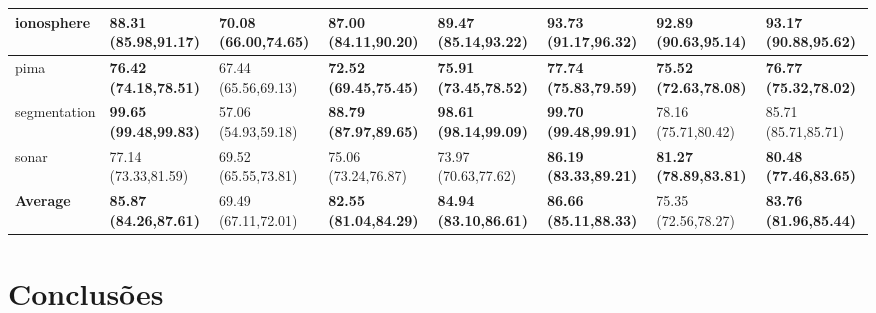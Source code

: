 \documentclass[conference]{IEEEtran}
\begin{document}
\begin{table*}[thpbh]
\begin{adjustbox}{width=1\textwidth}
\begin{tabular}{@{}cccccccc@{}}
			\multicolumn{1}{|l|}{ionosphere}   & \multicolumn{1}{l|}{\textbf{88.31 (85.98,91.17)}} & \multicolumn{1}{l|}{70.08 (66.00,74.65)} & \multicolumn{1}{l|}{\textbf{87.00 (84.11,90.20)}} & \multicolumn{1}{l|}{\textbf{89.47 (85.14,93.22)}}  & \multicolumn{1}{l|}{\textbf{93.73 (91.17,96.32)}}    & \multicolumn{1}{l|}{\textbf{92.89 (90.63,95.14)}}    & \multicolumn{1}{l|}{93.17 (90.88,95.62)}    \\ \midrule
			\multicolumn{1}{|l|}{pima}         & \multicolumn{1}{l|}{\textbf{76.42 (74.18,78.51)}} & \multicolumn{1}{l|}{67.44 (65.56,69.13)} & \multicolumn{1}{l|}{\textbf{72.52 (69.45,75.45)}} & \multicolumn{1}{l|}{\textbf{75.91 (73.45,78.52)}}  & \multicolumn{1}{l|}{\textbf{77.74 (75.83,79.59)}}    & \multicolumn{1}{l|}{\textbf{75.52 (72.63,78.08)}}    & \multicolumn{1}{l|}{\textbf{76.77 (75.32,78.02)}}    \\ \midrule
			\multicolumn{1}{|l|}{segmentation} & \multicolumn{1}{l|}{\textbf{99.65 (99.48,99.83)}} & \multicolumn{1}{l|}{57.06 (54.93,59.18)} & \multicolumn{1}{l|}{\textbf{88.79 (87.97,89.65)}} & \multicolumn{1}{l|}{\textbf{98.61 (98.14,99.09)}}  & \multicolumn{1}{l|}{\textbf{99.70 (99.48,99.91)}}    & \multicolumn{1}{l|}{78.16 (75.71,80.42)}    & \multicolumn{1}{l|}{85.71 (85.71,85.71)}    \\ \midrule
			\multicolumn{1}{|l|}{sonar}        & \multicolumn{1}{l|}{77.14 (73.33,81.59)} & \multicolumn{1}{l|}{69.52 (65.55,73.81)} & \multicolumn{1}{l|}{75.06 (73.24,76.87)} & \multicolumn{1}{l|}{73.97 (70.63,77.62)}  & \multicolumn{1}{l|}{\textbf{86.19 (83.33,89.21)}}    & \multicolumn{1}{l|}{\textbf{81.27 (78.89,83.81)}}    & \multicolumn{1}{l|}{\textbf{80.48 (77.46,83.65)}}    \\
			\midrule
			\multicolumn{1}{|l|}{\textbf{Average}}        & \multicolumn{1}{l|}{\textbf{85.87 (84.26,87.61)}} & \multicolumn{1}{l|}{69.49 (67.11,72.01)} & \multicolumn{1}{l|}{\textbf{82.55 (81.04,84.29)}} & \multicolumn{1}{l|}{\textbf{84.94 (83.10,86.61)}}  & \multicolumn{1}{l|}{\textbf{86.66 (85.11,88.33)}}    & \multicolumn{1}{l|}{75.35 (72.56,78.27)}    & \multicolumn{1}{l|}{\textbf{83.76 (81.96,85.44)}} \\ \bottomrule
		\end{tabular}
		\end{adjustbox}
	\end{table*}

	
	\section{Conclusões}
	
\end{document}
